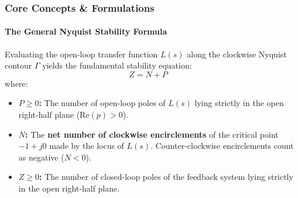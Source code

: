 \documentclass[12pt,onecolumn,twoside ]{article}
\begin{document}
	\subsubsection{Core Concepts \& Formulations}
	\paragraph{The General Nyquist Stability Formula}
	Evaluating the open-loop transfer function $L(s)$ along the clockwise Nyquist contour $\Gamma$ yields the fundamental stability equation: \[
	Z = N + P \quad
	\] where:
	\begin{itemize}
		\item
		\textbf{$P \ge 0$:} The number of open-loop poles of $L(s)$ lying strictly in the open right-half plane ($\text{Re}(p) > 0$).
		\item
		\textbf{$N$:} The \textbf{net number of clockwise encirclements} of the critical point $-1 + j0$ made by the locus of $L(s)$. Counter-clockwise encirclements count as negative ($N < 0$).
		\item
		\textbf{$Z \ge 0$:} The number of closed-loop poles of the feedback system lying strictly in the open right-half plane.
	\end{itemize}
\end{document}
